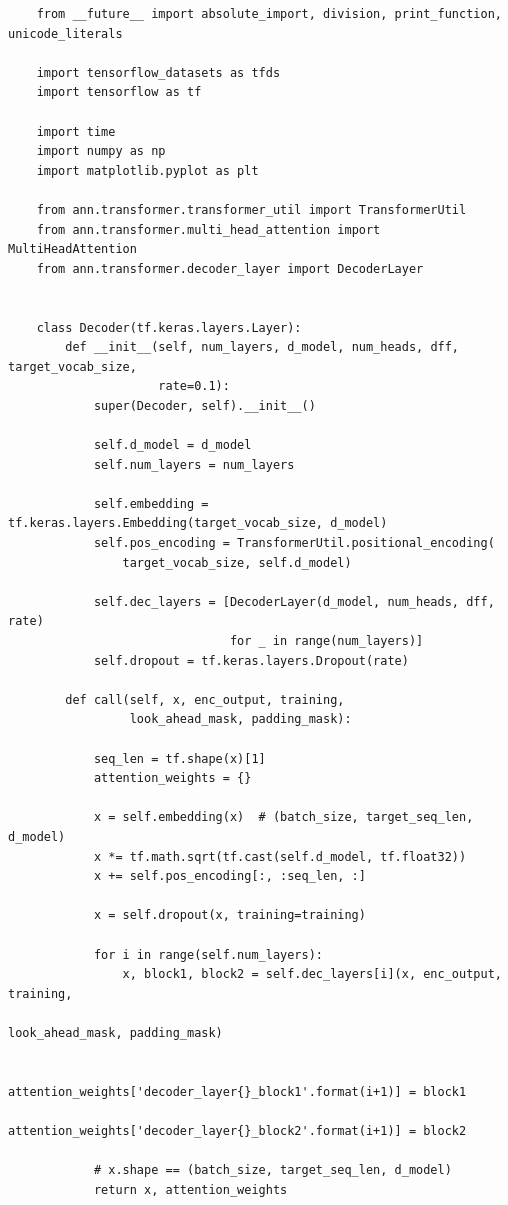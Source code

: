 \documentclass{article}
\begin{document}
\begin{lstlisting}
    from __future__ import absolute_import, division, print_function, unicode_literals

    import tensorflow_datasets as tfds
    import tensorflow as tf
    
    import time
    import numpy as np
    import matplotlib.pyplot as plt
    
    from ann.transformer.transformer_util import TransformerUtil
    from ann.transformer.multi_head_attention import MultiHeadAttention
    from ann.transformer.decoder_layer import DecoderLayer
    
    
    class Decoder(tf.keras.layers.Layer):
        def __init__(self, num_layers, d_model, num_heads, dff, target_vocab_size,
                     rate=0.1):
            super(Decoder, self).__init__()
    
            self.d_model = d_model
            self.num_layers = num_layers
    
            self.embedding = tf.keras.layers.Embedding(target_vocab_size, d_model)
            self.pos_encoding = TransformerUtil.positional_encoding(
                target_vocab_size, self.d_model)
    
            self.dec_layers = [DecoderLayer(d_model, num_heads, dff, rate)
                               for _ in range(num_layers)]
            self.dropout = tf.keras.layers.Dropout(rate)
    
        def call(self, x, enc_output, training,
                 look_ahead_mask, padding_mask):
    
            seq_len = tf.shape(x)[1]
            attention_weights = {}
    
            x = self.embedding(x)  # (batch_size, target_seq_len, d_model)
            x *= tf.math.sqrt(tf.cast(self.d_model, tf.float32))
            x += self.pos_encoding[:, :seq_len, :]
    
            x = self.dropout(x, training=training)
    
            for i in range(self.num_layers):
                x, block1, block2 = self.dec_layers[i](x, enc_output, training,
                                                       look_ahead_mask, padding_mask)
    
                attention_weights['decoder_layer{}_block1'.format(i+1)] = block1
                attention_weights['decoder_layer{}_block2'.format(i+1)] = block2
    
            # x.shape == (batch_size, target_seq_len, d_model)
            return x, attention_weights
\end{lstlisting}
\end{document}
